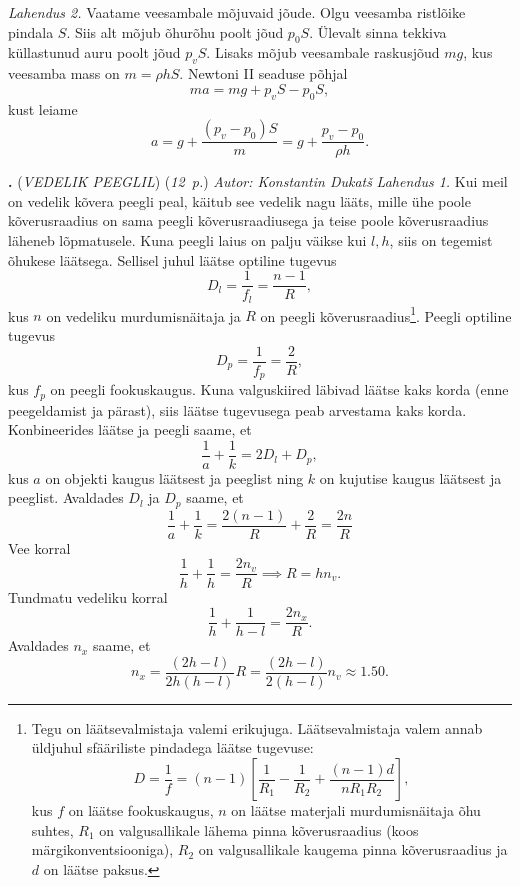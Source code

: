 \documentclass[11pt,a5paper]{article}
\newcommand{\numb}[1]{\vspace{5pt}\textbf{\large #1}}
\newcommand{\nimi}[1]{(\textsl{\small #1})}
\newcommand{\punktid}[1]{(\emph{#1~p.})}
\newcounter{ylesanne}
\newcommand{\yl}[1]{\addtocounter{ylesanne}{1}\numb{\theylesanne.} \nimi{#1} \newblock{}}
\newcommand{\autor}[1]{\emph{ Autor: #1}} %
\begin{document}
\emph{Lahendus 2.} Vaatame veesambale mõjuvaid jõude. Olgu veesamba ristlõike pindala $S$. Siis alt mõjub õhurõhu poolt jõud $p_0 S$. Ülevalt sinna tekkiva küllastunud auru poolt jõud $p_v S$. Lisaks mõjub veesambale raskusjõud $mg$, kus veesamba mass on $m=\rho hS$. Newtoni II seaduse põhjal
\[
  ma=mg+p_vS-p_0S,
\]
kust leiame
\[
  a=g+\frac{(p_v-p_0)S}{m}=g+\frac{p_v-p_0}{\rho h}.
\]

\yl{VEDELIK PEEGLIL}
\punktid{12} \autor{Konstantin Dukatš}
\emph{Lahendus 1.} Kui meil on vedelik kõvera peegli peal, käitub see vedelik nagu lääts, mille ühe poole kõverusraadius on sama peegli kõverusraadiusega ja teise poole kõverusraadius läheneb lõpmatusele. Kuna peegli laius on palju väikse kui $l,h$, siis on tegemist õhukese läätsega. Sellisel juhul läätse optiline tugevus
\[
  D_l=\frac{1}{f_l}=\frac{n-1}{R},
\]
kus $n$ on vedeliku murdumisnäitaja ja $R$ on peegli kõverusraadius\footnote{Tegu on läätsevalmistaja valemi erikujuga. Läätsevalmistaja valem annab üldjuhul sfääriliste pindadega läätse tugevuse:
  \[
    D=\frac{1}{f}=(n-1)\left[\frac{1}{R_1}-\frac{1}{R_2}+\frac{(n-1)d}{nR_1R_2}\right],
  \]
  kus $f$ on läätse fookuskaugus, $n$ on läätse materjali murdumisnäitaja õhu suhtes, $R_1$ on valgusallikale lähema pinna kõverusraadius (koos märgikonventsiooniga), $R_2$ on valgusallikale kaugema pinna kõverusraadius ja $d$ on läätse paksus.
}. Peegli optiline tugevus
\[
  D_p=\frac{1}{f_p}=\frac{2}{R},
\]
kus $f_p$ on peegli fookuskaugus. Kuna valguskiired läbivad läätse kaks korda (enne peegeldamist ja pärast), siis läätse tugevusega peab arvestama kaks korda. Konbineerides läätse ja peegli saame, et
\[
  \frac{1}{a}+\frac{1}{k}=2 D_l+D_p,
\]
kus $a$ on objekti kaugus läätsest ja peeglist ning $k$ on kujutise kaugus läätsest ja peeglist. Avaldades $D_l$ ja $D_p$ saame, et
\[
  \frac{1}{a}+\frac{1}{k}=\frac{2(n-1)}{R}+\frac{2}{R}=\frac{2n}{R}
\]
Vee korral
\[
  \frac{1}{h}+\frac{1}{h}=\frac{2 n_v }{R} \implies R=h n_v.
\]
Tundmatu vedeliku korral
\[
  \frac{1}{h}+\frac{1}{h-l}=\frac{2 n_x }{R}.
\]
Avaldades $n_x$ saame, et
\[
  n_x =\frac{(2h-l)}{2h(h-l)} R =\frac{(2h-l)}{2(h-l)} n_v \approx \num{1.50}.
\]
\end{document}
